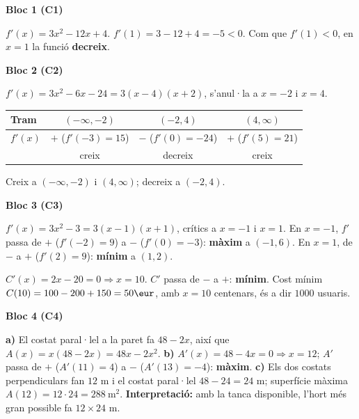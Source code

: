 \newpage
\begin{solucions}

\noindent\textbf{Bloc 1 (C1)}
\begin{sollist}
  \item $f'(x)=3x^2-12x+4$. $f'(1)=3-12+4=-5<0$. Com que $f'(1)<0$, en $x=1$ la funció
        \textbf{decreix}.
\end{sollist}

\noindent\textbf{Bloc 2 (C2)}
\begin{sollist}\setcounter{enumi}{1}
  \item $f'(x)=3x^2-6x-24=3(x-4)(x+2)$, s'anul·la a $x=-2$ i $x=4$.
        \begin{center}
        \renewcommand{\arraystretch}{1.2}
        \begin{tabular}{l c c c}
        \toprule
        \textbf{Tram} & $(-\infty,-2)$ & $(-2,4)$ & $(4,\infty)$ \\
        \midrule
        $f'(x)$ & $+$ ($f'(-3)=15$) & $-$ ($f'(0)=-24$) & $+$ ($f'(5)=21$) \\
        & creix & decreix & creix \\
        \bottomrule
        \end{tabular}
        \end{center}
        Creix a $(-\infty,-2)$ i $(4,\infty)$; decreix a $(-2,4)$.
\end{sollist}

\noindent\textbf{Bloc 3 (C3)}
\begin{sollist}\setcounter{enumi}{2}
  \item $f'(x)=3x^2-3=3(x-1)(x+1)$, crítics a $x=-1$ i $x=1$. En $x=-1$, $f'$ passa de
        $+$ ($f'(-2)=9$) a $-$ ($f'(0)=-3$): \textbf{màxim} a $(-1,6)$. En $x=1$, de $-$
        a $+$ ($f'(2)=9$): \textbf{mínim} a $(1,2)$.
  \item $C'(x)=2x-20=0\Rightarrow x=10$. $C'$ passa de $-$ a $+$: \textbf{mínim}. Cost
        mínim $C(10)=100-200+150=50\eur$, amb $x=10$ centenars, és a dir $\num{1000}$
        usuaris.
\end{sollist}

\noindent\textbf{Bloc 4 (C4)}
\begin{sollist}\setcounter{enumi}{4}
  \item \textbf{a)} El costat paral·lel a la paret fa $48-2x$, així que
        $A(x)=x(48-2x)=48x-2x^2$.
        \textbf{b)} $A'(x)=48-4x=0\Rightarrow x=12$; $A'$ passa de $+$ ($A'(11)=4$) a $-$
        ($A'(13)=-4$): \textbf{màxim}.
        \textbf{c)} Els dos costats perpendiculars fan $12$ m i el costat paral·lel
        $48-24=24$ m; superfície màxima $A(12)=12\cdot 24=288\ \text{m}^2$.
        \textbf{Interpretació:} amb la tanca disponible, l'hort més gran possible fa
        $12\times 24$ m.
\end{sollist}

\end{solucions}


